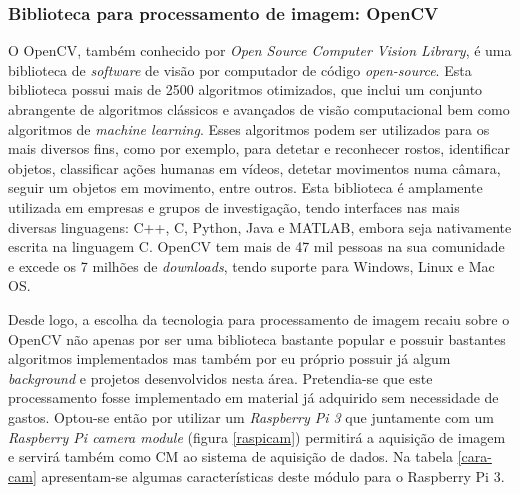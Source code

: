 

\subsubsection{Biblioteca para processamento de imagem: OpenCV}

O OpenCV, também conhecido por \textit{Open Source Computer Vision Library}, é uma biblioteca de \textit{software} de visão por computador de código \textit{open-source}. Esta biblioteca possui mais de 2500 algoritmos otimizados, que inclui um conjunto abrangente de algoritmos clássicos e avançados de visão computacional bem como algoritmos de \textit{machine learning}. Esses algoritmos podem ser utilizados para os mais diversos fins, como por exemplo, para detetar e reconhecer rostos, identificar objetos, classificar ações humanas em vídeos, detetar movimentos numa câmara, seguir um objetos em movimento, entre outros. Esta biblioteca é amplamente utilizada em empresas e grupos de investigação, tendo interfaces nas mais diversas linguagens: C++, C, Python, Java e MATLAB, embora seja nativamente escrita na linguagem C. OpenCV tem mais de 47 mil pessoas na sua comunidade e excede os 7 milhões de \textit{downloads}, tendo suporte para Windows, Linux e Mac OS\cite{Itseez}.









Desde logo, a escolha da tecnologia para processamento de imagem recaiu sobre o OpenCV não apenas por ser uma biblioteca bastante popular e possuir bastantes algoritmos implementados mas também por eu próprio possuir já algum \textit{background} e projetos desenvolvidos nesta área. Pretendia-se que este processamento fosse implementado em material já adquirido sem necessidade de gastos. Optou-se então por utilizar um \textit{Raspberry Pi 3} que juntamente com um \textit{Raspberry Pi camera module} (figura \ref{raspicam}) permitirá a aquisição de imagem e servirá também como \acl{CM} ao sistema de aquisição de dados. Na tabela \ref{cara-cam} apresentam-se algumas características deste módulo para o Raspberry Pi 3. 


